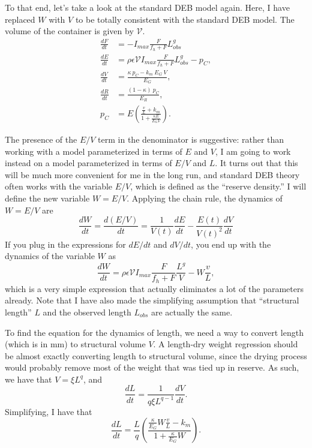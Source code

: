 \documentclass[12pt,reqno,final,pdftex]{amsart}\usepackage[]{graphicx}\usepackage[]{color}
\theoremstyle{plain}
\numberwithin{equation}{part}
\begin{document}
To that end, let's take a look at the standard DEB model again.
Here, I have replaced $W$ with $V$ to be totally consistent with the standard DEB model.
The volume of the container is given by $\mathcal{V}$.
\begin{align}
\frac{dF}{dt} &= -I_{max} \frac{F}{f_h+F} L_{obs}^g \\
\frac{dE}{dt} &= \rho \epsilon \mathcal{V} I_{max} \frac{F}{f_h+F} L_{obs}^g - p_C, \\
\frac{dV}{dt} &= \frac{\kappa~p_C - k_m~E_G~V}{E_G}, \\
\frac{dR}{dt} &= \frac{(1-\kappa)~p_C}{E_R}, \\
p_C &= E \left(\frac{\frac{v}{L} + k_m}{1+\frac{\kappa E}{E_G V}}\right).
\end{align}

The presence of the $E/V$ term in the denominator is suggestive: rather than working with a model parameterized in terms of $E$ and $V$, I am going to work instead on a model parameterized in terms of $E/V$ and $L$.
It turns out that this will be much more convenient for me in the long run, and standard DEB theory often works with the variable $E/V$, which is defined as the ``reserve density.''
I will define the new variable $W = E/V$.
Applying the chain rule, the dynamics of $W=E/V$ are
\begin{equation}
\frac{dW}{dt} = \frac{d(E/V)}{dt} = \frac{1}{V(t)}\frac{dE}{dt} - \frac{E(t)}{V(t)^2}\frac{dV}{dt}
\end{equation}
If you plug in the expressions for $dE/dt$ and $dV/dt$, you end up with the dynamics of the variable $W$ as
\begin{equation}
\frac{dW}{dt} = \rho \epsilon \mathcal{V} I_{max} \frac{F}{f_h+F} \frac{L^g}{V} - W \frac{v}{L},
\end{equation}
which is a very simple expression that actually eliminates a lot of the parameters already.
Note that I have also made the simplifying assumption that ``structural length'' $L$ and the observed length $L_{obs}$ are actually the same.

To find the equation for the dynamics of length, we need a way to convert length (which is in mm) to structural volume $V$.
A length-dry weight regression should be almost exactly converting length to structural volume, since the drying process would probably remove most of the weight that was tied up in reserve.
As such, we have that $V = \xi L^q$, and
\begin{equation}
\frac{dL}{dt} = \frac{1}{q \xi L^{q-1}}\frac{dV}{dt}.
\end{equation}
Simplifying, I have that
\begin{equation}\label{eq:length}
\frac{dL}{dt} = \frac{L}{q}\left(\frac{\frac{\kappa}{E_G}W\frac{v}{L} - k_m}{1 + \frac{\kappa}{E_G}W}\right).
\end{equation}
\end{document}

